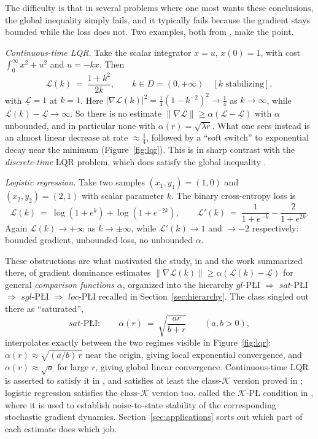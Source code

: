 \documentclass[11pt]{article}
\theoremstyle{plain}
\theoremstyle{definition}
\theoremstyle{remark}
\begin{document}
The difficulty is that in several problems where one most wants these
conclusions, the global inequality simply fails, and it typically
fails because the gradient stays bounded while the loss does not.
Two examples, both from \cite{Sontag2025L4DC}, make the point.

\smallskip
\emph{Continuous-time LQR.} Take the scalar integrator $\dot x = u$, $x(0)=1$,
with cost $\int_0^\infty x^2 + u^2$ and $u = -kx$. Then
\begin{equation}\label{eq:lqrscalar}
  \mathcal{L}(k) \ =\ \frac{1+k^2}{2k} ,
  \qquad k \in D = (0,+\infty) \quad [k \text{ stabilizing}] ,
\end{equation}
with $\underline{\mathcal{L}} = 1$ at $k=1$. Here
$|\nabla\mathcal{L}(k)|^2 = \tfrac14(1-k^{-2})^2 \to \tfrac14$ as $k\to\infty$,
while $\mathcal{L}(k)-\underline{\mathcal{L}}\to\infty$. So there is no estimate
$\|\nabla\mathcal{L}\| \ge \alpha(\mathcal{L}-\underline{\mathcal{L}})$ with
$\alpha$ unbounded, and in particular none with $\alpha(r) = \sqrt{\lambda r}$.
What one sees instead is an almost linear decrease at rate $\approx\tfrac14$,
followed by a ``soft switch'' to exponential decay near the minimum
(Figure~\ref{fig:lqr}). This is in sharp contrast with the \emph{discrete-time}
LQR problem, which does satisfy the global inequality \cite{Fazel2018}.

\smallskip
\emph{Logistic regression.} Take two samples $(x_1,y_1) = (1,0)$ and
$(x_2,y_2) = (2,1)$ with scalar parameter $k$. The binary cross-entropy loss is
\begin{equation}\label{eq:logistic}
  \mathcal{L}(k) \ =\ \log(1+e^{k}) + \log(1+e^{-2k}) ,
  \qquad
  \mathcal{L}'(k) \ =\ \frac{1}{1+e^{-k}} - \frac{2}{1+e^{2k}} .
\end{equation}
Again $\mathcal{L}(k)\to+\infty$ as $k\to\pm\infty$, while
$\mathcal{L}'(k) \to 1$ and $\to -2$ respectively: bounded gradient, unbounded
loss, no unbounded $\alpha$.

\smallskip
These obstructions are what motivated the study, in \cite{Sontag2025L4DC} and the
work summarized there, of gradient dominance estimates
$\|\nabla\mathcal{L}(k)\| \ge \alpha(\mathcal{L}(k)-\underline{\mathcal{L}})$ for
general \emph{comparison functions} $\alpha$, organized into the hierarchy
$gl$-P\L{}I $\Rightarrow$ $sat$-P\L{}I $\Rightarrow$ $sgl$-P\L{}I $\Rightarrow$
$loc$-P\L{}I recalled in Section~\ref{sec:hierarchy}. The class singled out
there as ``saturated'',
\[
  sat\text{-P\L{}I}: \qquad \alpha(r) \ =\ \sqrt{\frac{ar}{b+r}}
  \qquad (a,b>0) ,
\]
interpolates exactly between the two regimes visible in Figure~\ref{fig:lqr}:
$\alpha(r) \approx \sqrt{(a/b)\,r}$ near the origin, giving local exponential
convergence, and $\alpha(r)\approx\sqrt a$ for large $r$, giving global linear
convergence. Continuous-time LQR is asserted to satisfy it in
\cite{Sontag2025L4DC}, and satisfies at least the class-$\mathcal{K}$ version
proved in \cite{CuiJiangSontag2024}; logistic regression satisfies the
class-$\mathcal{K}$ version too, called the $\mathcal{K}$-P\L{} condition in
\cite{CuiJiangSontag2026}, where it is used to establish noise-to-state stability
of the corresponding stochastic gradient dynamics. Section~\ref{sec:applications}
sorts out which part of each estimate does which job.
\end{document}
